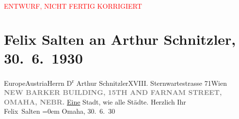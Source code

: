 
\begin{center}
            \textcolor{red}{ENTWURF, NICHT FERTIG KORRIGIERT}
                      \end{center}
            
         
         \renewcommand{\erwaehntePersonen}{Personen: Felix Salten}
         \renewcommand{\erwaehnteOrte}{Orte: 15th Street (Omaha), Barker Building, Europa, Farnam Street, Omaha, Sternwartestraße, Wien, Österreich}
         \renewcommand{\erwaehnteWerke}{}
               \section[Felix Salten an Arthur Schnitzler, 30. 6. 1930]{ Felix Salten an Arthur Schnitzler, 30. 6. 1930}\nopagebreak{}\rehead{ }\begin{ledgroupsized}[t]{13cm}\normalsize\beginnumbering \toendnotes[C]{\smallbreak\pagebreak[2]} 
\pstart{}{\pb}Europe\pend{}\pstart{}Austria\pend{}\pstart{}Herrn D\textsuperscript{r} Arthur Schnitzler\pend{}\pstart{}XVIII. Sternwartestrasse 71\pend{}\pstart{}Wien\pend{}{\bigskip}\pstart
           \noindent{}\centering{}{\pb}\textcolor{gray}{\textbf{NEW BARKER BUILDING, 15TH AND FARNAM
                           STREET, OMAHA, NEBR.}}\pend
           \pstart
           {\pb}\uline{Eine} Stadt, wie alle Städte.\pend
           \pstart
           Herzlich Ihr {\\[\baselineskip]}\spacefill\mbox{Felix Salten}\pend
           \leftskip=0em{}\pstart
           Omaha, 30. 6. 30\pend
           
         
         \endnumbering{}\end{ledgroupsized}\begin{anhang}\end{anhang}\newcommand{\dateiname}{L02799}\newcommand{\titel}{Felix Salten an Arthur Schnitzler, 30. 6. 1930}\newcommand{\editorInnen}{Martin Anton Müller und Laura Untner}
      